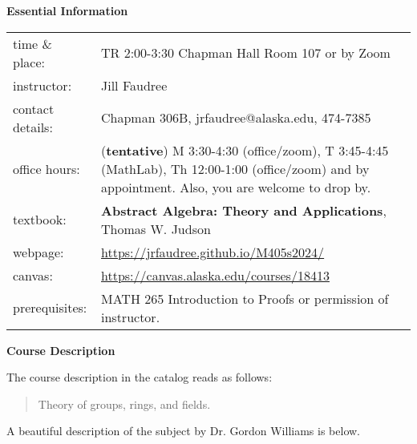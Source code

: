 \documentclass[12pt]{article}
\begin{document}
\textbf{\large{Essential Information}}

\begin{tabular}{p{} p{}}
{time \& place}:&TR 2:00-3:30 Chapman Hall Room 107 or by Zoom\\
{instructor:} &Jill Faudree\\
{contact details:} &Chapman 306B, jrfaudree@alaska.edu, 474-7385\\
{office hours:} &(\textbf{tentative})  M 3:30-4:30 (office/zoom), T 3:45-4:45 (MathLab), Th 12:00-1:00 (office/zoom) and by appointment. Also, you are welcome to drop by.\\
{textbook:}& \textbf{Abstract Algebra: Theory and Applications}, Thomas W. Judson\\
{webpage:}& \url{https://jrfaudree.github.io/M405s2024/}\\
canvas:&\url{https://canvas.alaska.edu/courses/18413}\\
{prerequisites:} & MATH 265 Introduction to Proofs or permission of instructor.
\end{tabular}



\textbf{\large{Course Description}}

The course description in the catalog reads as follows:
\begin{quote} Theory of groups, rings, and fields. \end{quote}

A beautiful description of the subject by Dr. Gordon Williams is below.
\end{document}
